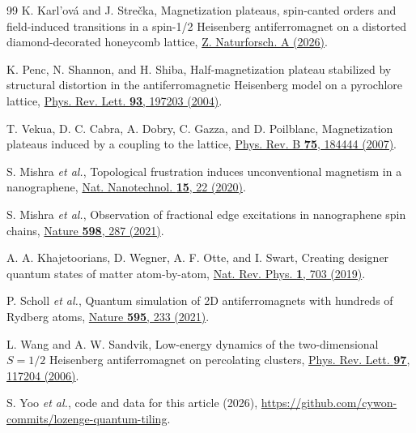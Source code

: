 \documentclass[prb,twocolumn,amsmath,amssymb,floatfix]{revtex4-2}
\begin{document}
\begin{thebibliography}{99}
 K. Karl'ov\'a and J. Stre\v{c}ka, Magnetization plateaus, spin-canted orders and field-induced transitions in a spin-1/2 Heisenberg antiferromagnet on a distorted diamond-decorated honeycomb lattice, \href{https://doi.org/10.1515/zna-2025-0390}{Z. Naturforsch. A (2026)}.

 K. Penc, N. Shannon, and H. Shiba, Half-magnetization plateau stabilized by structural distortion in the antiferromagnetic Heisenberg model on a pyrochlore lattice, \href{https://doi.org/10.1103/PhysRevLett.93.197203}{Phys. Rev. Lett. \textbf{93}, 197203 (2004)}.

 T. Vekua, D. C. Cabra, A. Dobry, C. Gazza, and D. Poilblanc, Magnetization plateaus induced by a coupling to the lattice, \href{https://doi.org/10.1103/PhysRevB.75.184444}{Phys. Rev. B \textbf{75}, 184444 (2007)}.

 S. Mishra \textit{et al.}, Topological frustration induces unconventional magnetism in a nanographene, \href{https://doi.org/10.1038/s41565-019-0577-9}{Nat. Nanotechnol. \textbf{15}, 22 (2020)}.

 S. Mishra \textit{et al.}, Observation of fractional edge excitations in nanographene spin chains, \href{https://doi.org/10.1038/s41586-021-03842-3}{Nature \textbf{598}, 287 (2021)}.

 A. A. Khajetoorians, D. Wegner, A. F. Otte, and I. Swart, Creating designer quantum states of matter atom-by-atom, \href{https://doi.org/10.1038/s42254-019-0108-5}{Nat. Rev. Phys. \textbf{1}, 703 (2019)}.

 P. Scholl \textit{et al.}, Quantum simulation of 2D antiferromagnets with hundreds of Rydberg atoms, \href{https://doi.org/10.1038/s41586-021-03585-1}{Nature \textbf{595}, 233 (2021)}.

 L. Wang and A. W. Sandvik, Low-energy dynamics of the two-dimensional $S=1/2$ Heisenberg antiferromagnet on percolating clusters, \href{https://doi.org/10.1103/PhysRevLett.97.117204}{Phys. Rev. Lett. \textbf{97}, 117204 (2006)}.

 S. Yoo \textit{et al.}, code and data for this article (2026), \url{https://github.com/cywon-commits/lozenge-quantum-tiling}.

\end{thebibliography}
\end{document}
